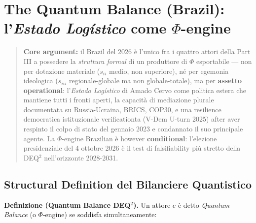 \chapter{\texorpdfstring{The Quantum Balance (Brazil):
l'\emph{Estado Logístico} come
\(\Phi\)-engine}{The Quantum Balance (Brazil): l'Estado Logístico come \textbackslash Phi-engine}}\label{il-bilanciere-quantistico-brasile-lestado-loguxedstico-come-phi-engine}

\begin{quote}
\textbf{Core argument:} il Brazil del 2026 è l'unico fra i quattro
attori della Part III a possedere la \emph{struttura formal} di un
produttore di \(\Phi\) esportabile --- non per dotazione materiale
(\(s_{ii}\) medio, non superiore), né per egemonia ideologica
(\(s_{iii}\) regionale-globale ma non globale-totale), ma per
\textbf{assetto operational}: l'\emph{Estado Logístico} di Amado Cervo
come politica estera che mantiene tutti i fronti aperti, la capacità di
mediazione plurale documentata su Russia-Ucraina, BRICS, COP30, e una
resilience democratica istituzionale verificationta (V-Dem U-turn 2025) after
aver respinto il colpo di stato del gennaio 2023 e condannato il suo
principale agente. La \(\Phi\)-engine Brazilian è however
\textbf{conditional}: l'elezione presidenziale del 4 ottobre 2026 è il
test di falsifiability più stretto della DEQ$^2$ nell'orizzonte 2028-2031.
\end{quote}



\section{Structural Definition del Bilanciere
Quantistico}\label{definition-structural-del-bilanciere-quantistico}

\Hypoth{} \textbf{Definizione (Quantum Balance DEQ$^2$).} Un attore
\(e\) è detto \emph{Quantum Balance} (o \(\Phi\)-engine) se
soddisfa simultaneamente:

